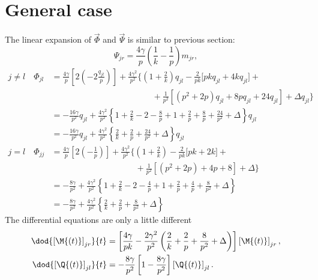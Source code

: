\section{General case}
The linear expansion of \(\vec{\Phi}\) and \(\vec{\Psi}\) is similar to previous section:
\[
  \Psi_{jr} = \frac{4 \gamma}{p} \left(\frac1k - \frac{1}{p}\right) m_{jr},
\]\[
  \begin{split}
    j \neq l \quad \Phi_{jl} &= \frac{4 \gamma}{p}\left[
        2\left( - 2\frac{q_{jl}}{p}\right)
    \right] + \frac{4 \gamma^2}{p^2} \Biggr\{
          \left(1+\frac2k\right)q_{jl} -\frac2{pk}\Biggl[pk q_{jl} + 4 k q_{jl} \Biggl] + \\
          &\qquad\qquad\qquad\qquad\qquad\qquad+\frac1{p^2}\left[\left(p^2+2p\right)q_{jl} +
          8p q_{jl} + 24q_{jl} \right] + \Delta q_{jl}\Biggr\} \\ 
    &= -\frac{16 \gamma}{p^2} q_{jl} 
      +\frac{4 \gamma^2}{p^2} \left\{
        1+\frac2k -2 -\frac{8}{p} +1 +\frac2p +\frac8p + \frac{24}{p^2} + \Delta \right\}q_{jl} \\
    &= -\frac{16 \gamma}{p^2} q_{jl} 
    +\frac{4 \gamma^2}{p^2} \left\{\frac2k +\frac{2}{p} + \frac{24}{p^2} + \Delta \right\}q_{jl}
\\
    j = l \quad \Phi_{jj} &= \frac{4 \gamma}{p}\left[
        2\left( -\frac{1}{p}\right)
    \right] + \frac{4 \gamma^2}{p^2} \Biggr\{
          \left(1+\frac2k\right) -\frac2{pk}\Biggl[pk + 2k \Biggl] + \\
          &\qquad\qquad\qquad\qquad\qquad+\frac1{p^2}\left[\left(p^2+2p\right) +
          4p + 8 \right] + \Delta\Biggr\} \\
    &= -\frac{8 \gamma}{p^2} + \frac{4 \gamma^2}{p^2} \left\{
      1+\frac2k -2 -\frac{4}{p} +1 +\frac2p +\frac4p + \frac{8}{p^2} + \Delta \right\} \\
    &= -\frac{8 \gamma}{p^2} +\frac{4 \gamma^2}{p^2} \left\{\frac2k +\frac{2}{p} + \frac{8}{p^2} + \Delta \right\}
  \end{split}
\]
The differential equations are only a little different
\begin{equation}\begin{split}
  \dod{\left[\M{\left(t\right)}\right]_{jr}}{t}
    &= \left[
      \frac{4 \gamma}{pk} -\frac{2 \gamma^2}{p^2} \left(\frac2k +\frac{2}{p} + \frac{8}{p^2} + \Delta \right)
    \right] \left[\M{\left(t\right)}\right]_{jr},\\
  \dod{\left[\Q{\left(t\right)}\right]_{jl}}{t} &= -\frac{8 \gamma}{p^2} \left[1-\frac{8\gamma}{p^2}\right] \left[\Q{\left(t\right)}\right]_{jl}.
\end{split}\end{equation}